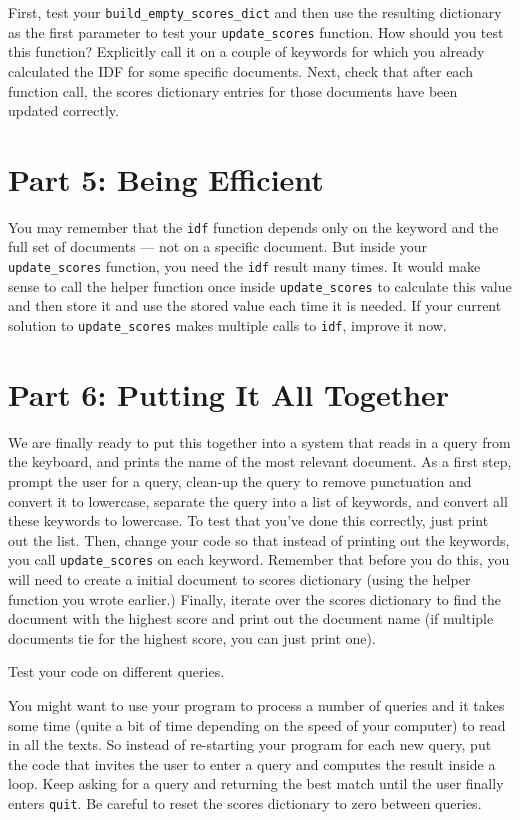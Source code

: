 \documentclass{assignment}
\begin{document}
First, test your \verb|build_empty_scores_dict| and then use the resulting dictionary as the first parameter to test your \verb|update_scores| function. How should you
test this function? Explicitly call it on a couple of keywords for which you already calculated the IDF for some specific documents. Next, check that after each function
call, the scores dictionary entries for those documents have been updated correctly. 

\section*{Part 5: Being Efficient}
You may remember that the \verb|idf| function depends only on the keyword and the full set of 
documents --- not on a specific document. But inside your \verb|update_scores| function, you need the 
\verb|idf| result many times. It would make sense to call the helper function once inside \verb|update_scores| to calculate this value and
then store it and use the stored value each time it is needed. If your current solution to \verb|update_scores|
makes multiple calls to \verb|idf|, improve it now. 

\section*{Part 6: Putting It All Together}
We are finally ready to put this together into a system that reads in a query from the keyboard, and prints the name of the most relevant document. As a first step,
prompt the user for a query, clean-up the query to remove punctuation and convert it to lowercase, 
separate the query into a list of keywords, and convert all these keywords to lowercase. 
To test that you've done this correctly, just print out 
the list. Then, change your code so that instead of printing out the keywords, you call \verb|update_scores| on each keyword. Remember that before you do this, you
will need to create a initial document to scores dictionary (using the helper function you wrote earlier.) Finally, iterate over the scores dictionary to find the document with the highest score and print out the document name (if multiple documents tie for the highest score, you can just print one).

Test your code on different queries.

You might want to use your program to process a number of queries and it takes some time (quite a bit of time
depending on the speed of your computer) to read in all the texts. So instead of re-starting your program for each
new query, put the code that invites the user to enter a query and computes the result inside a loop.
Keep asking for a query and returning the best match until the user finally enters \verb|quit|. Be careful to
reset the scores dictionary to zero between queries.
\end{document}
